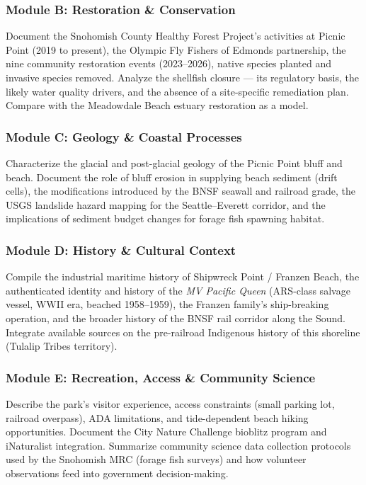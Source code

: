\documentclass[11pt,letterpaper]{article}
\begin{document}
\subsubsection{Module B: Restoration \& Conservation}

Document the Snohomish County Healthy Forest Project's activities at Picnic Point (2019 to present), the Olympic Fly Fishers of Edmonds partnership, the nine community restoration events (2023--2026), native species planted and invasive species removed. Analyze the shellfish closure --- its regulatory basis, the likely water quality drivers, and the absence of a site-specific remediation plan. Compare with the Meadowdale Beach estuary restoration as a model.

\subsubsection{Module C: Geology \& Coastal Processes}

Characterize the glacial and post-glacial geology of the Picnic Point bluff and beach. Document the role of bluff erosion in supplying beach sediment (drift cells), the modifications introduced by the BNSF seawall and railroad grade, the USGS landslide hazard mapping for the Seattle--Everett corridor, and the implications of sediment budget changes for forage fish spawning habitat.

\subsubsection{Module D: History \& Cultural Context}

Compile the industrial maritime history of Shipwreck Point / Franzen Beach, the authenticated identity and history of the \textit{MV Pacific Queen} (ARS-class salvage vessel, WWII era, beached 1958--1959), the Franzen family's ship-breaking operation, and the broader history of the BNSF rail corridor along the Sound. Integrate available sources on the pre-railroad Indigenous history of this shoreline (Tulalip Tribes territory).

\subsubsection{Module E: Recreation, Access \& Community Science}

Describe the park's visitor experience, access constraints (small parking lot, railroad overpass), ADA limitations, and tide-dependent beach hiking opportunities. Document the City Nature Challenge bioblitz program and iNaturalist integration. Summarize community science data collection protocols used by the Snohomish MRC (forage fish surveys) and how volunteer observations feed into government decision-making.
\end{document}
